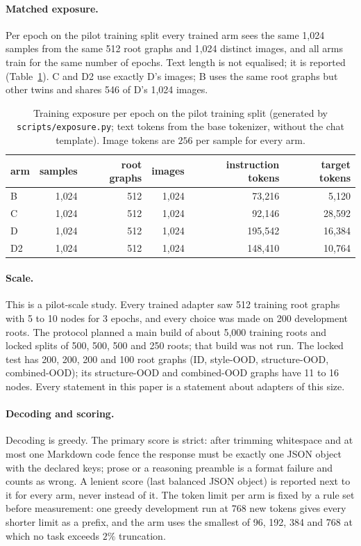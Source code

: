 \paragraph{Matched exposure.}
Per epoch on the pilot training split every trained arm sees the same 1{,}024 samples from
the same 512 root graphs and 1{,}024 distinct images, and all arms train for the same number
of epochs. Text length is not equalised; it is reported (Table~\ref{tab:exposure}). C and D2
use exactly D's images; B uses the same root graphs but other twins and shares 546 of D's
1{,}024 images.

\begin{table}[h]
\centering
\small
\begin{tabular}{lrrrrr}
\toprule
arm & samples & root graphs & images & instruction tokens & target tokens \\
\midrule
B  & 1{,}024 & 512 & 1{,}024 &  73{,}216 &  5{,}120 \\
C  & 1{,}024 & 512 & 1{,}024 &  92{,}146 & 28{,}592 \\
D  & 1{,}024 & 512 & 1{,}024 & 195{,}542 & 16{,}384 \\
D2 & 1{,}024 & 512 & 1{,}024 & 148{,}410 & 10{,}764 \\
\bottomrule
\end{tabular}
\caption{Training exposure per epoch on the pilot training split (generated by
\texttt{scripts/exposure.py}; text tokens from the base tokenizer, without the chat template).
Image tokens are $256$ per sample for every arm.}
\label{tab:exposure}
\end{table}

\paragraph{Scale.}
This is a pilot-scale study. Every trained adapter saw 512 training root graphs with 5 to 10
nodes for 3 epochs, and every choice was made on 200 development roots. The protocol planned a
main build of about 5{,}000 training roots and locked splits of 500, 500, 500 and 250 roots;
that build was not run. The locked test has 200, 200, 200 and 100 root graphs (ID, style-OOD,
structure-OOD, combined-OOD); its structure-OOD and combined-OOD graphs have 11 to 16 nodes.
Every statement in this paper is a statement about adapters of this size.

\paragraph{Decoding and scoring.}
Decoding is greedy. The primary score is strict: after trimming whitespace and at most one
Markdown code fence the response must be exactly one JSON object with the declared keys;
prose or a reasoning preamble is a format failure and counts as wrong. A lenient score (last
balanced JSON object) is reported next to it for every arm, never instead of it. The token
limit per arm is fixed by a rule set before measurement: one greedy development run at 768 new
tokens gives every shorter limit as a prefix, and the arm uses the smallest of 96, 192, 384
and 768 at which no task exceeds $2\%$ truncation.

